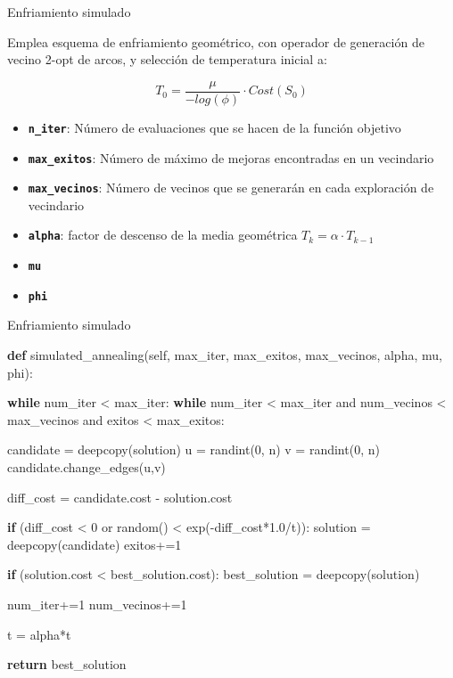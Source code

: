 \documentclass[ignorenonframetext,]{beamer}
\newenvironment{Shaded}{}{}
\newcommand{\KeywordTok}[1]{\textcolor[rgb]{0.00,0.44,0.13}{\textbf{{#1}}}}
\newcommand{\DecValTok}[1]{\textcolor[rgb]{0.25,0.63,0.44}{{#1}}}
\newcommand{\FloatTok}[1]{\textcolor[rgb]{0.25,0.63,0.44}{{#1}}}
\newcommand{\OtherTok}[1]{\textcolor[rgb]{0.00,0.44,0.13}{{#1}}}
\newcommand{\NormalTok}[1]{{#1}}
\begin{document}
\begin{frame}{Enfriamiento simulado}

Emplea esquema de enfriamiento geométrico, con operador de generación de
vecino 2-opt de arcos, y selección de temperatura inicial a:

\[T_0 = \frac{\mu}{-log(\phi)} \cdot Cost(S_0)  \]

\begin{itemize}
\item
  \textbf{\texttt{n\_iter}}: Número de evaluaciones que se hacen de la
  función objetivo
\item
  \textbf{\texttt{max\_exitos}}: Número de máximo de mejoras encontradas
  en un vecindario
\item
  \textbf{\texttt{max\_vecinos}}: Número de vecinos que se generarán en
  cada exploración de vecindario
\item
  \textbf{\texttt{alpha}}: factor de descenso de la media geométrica
  $T_k = \alpha \cdot T_{k-1}$
\item
  \textbf{\texttt{mu}}
\item
  \textbf{\texttt{phi}}
\end{itemize}

\end{frame}

\begin{frame}[fragile]{Enfriamiento simulado}

\begin{Shaded}
\begin{Highlighting}[]
\KeywordTok{def} \NormalTok{simulated_annealing(}\OtherTok{self}\NormalTok{, max_iter, max_exitos, max_vecinos, alpha, mu, phi):}
        
    \KeywordTok{while} \NormalTok{num_iter < max_iter:           }
        \KeywordTok{while} \NormalTok{num_iter < max_iter and num_vecinos < max_vecinos and exitos < max_exitos:}

            \NormalTok{candidate = deepcopy(solution)}
            \NormalTok{u = randint(}\DecValTok{0}\NormalTok{, n)}
            \NormalTok{v = randint(}\DecValTok{0}\NormalTok{, n)   }
            \NormalTok{candidate.change_edges(u,v)}

            \NormalTok{diff_cost = candidate.cost - solution.cost}

            \KeywordTok{if} \NormalTok{(diff_cost < }\DecValTok{0} \NormalTok{or random() < exp(-diff_cost*}\FloatTok{1.0}\NormalTok{/t)):}
                \NormalTok{solution = deepcopy(candidate)}
                \NormalTok{exitos+=}\DecValTok{1}

                \KeywordTok{if} \NormalTok{(solution.cost < best_solution.cost):}
                    \NormalTok{best_solution = deepcopy(solution)}

            \NormalTok{num_iter+=}\DecValTok{1}
            \NormalTok{num_vecinos+=}\DecValTok{1}

        \NormalTok{t = alpha*t}

    \KeywordTok{return} \NormalTok{best_solution}
    
\end{Highlighting}
\end{Shaded}

\end{frame}
\end{document}
